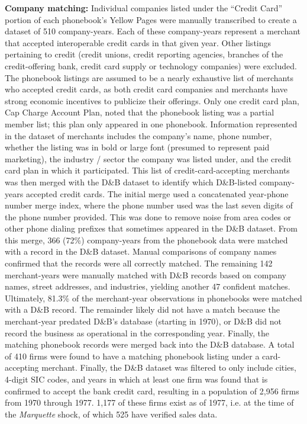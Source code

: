 \documentclass[12pt,english]{article}
\begin{document}
\textbf{Company matching:}
Individual companies listed under the ``Credit Card'' portion of each phonebook's Yellow Pages were manually transcribed to create a dataset of 510 company-years. Each of these company-years represent a merchant that accepted interoperable credit cards in that given year. Other listings pertaining to credit (credit unions, credit reporting agencies, branches of the credit-offering bank, credit card supply or technology companies) were excluded. The phonebook listings are assumed to be a nearly exhaustive list of merchants who accepted credit cards, as both credit card companies and merchants have strong economic incentives to publicize their offerings. Only one credit card plan, Cap Charge Account Plan, noted that the phonebook listing was a partial member list; this plan only appeared in one phonebook. Information represented in the dataset of merchants includes the company's name, phone number, whether the listing was in bold or large font (presumed to represent paid marketing), the industry / sector the company was listed under, and the credit card plan in which it participated. 
This list of credit-card-accepting merchants was then merged with the D\&B dataset to identify which D\&B-listed company-years accepted credit cards. The initial merge used a concatenated year-phone number merge index, where the phone number used was the last seven digits of the phone number provided. This was done to remove noise from area codes or other phone dialing prefixes that sometimes appeared in the D\&B dataset. From this merge, 366 (72\%) company-years from the phonebook data were matched with a record in the D\&B dataset. Manual comparisons of company names confirmed that the records were all correctly matched. The remaining 142 merchant-years were manually matched with D\&B records based on company names, street addresses, and industries, yielding another 47 confident matches. Ultimately, 81.3\% of the merchant-year observations in phonebooks were matched with a D\&B record. The remainder likely did not have a match because the merchant-year predated D\&B's database (starting in 1970), or D\&B did not record the business as operational in the corresponding year. Finally, the matching phonebook records were merged back into the D\&B database. A total of 410 firms were found to have a matching phonebook listing under a card-accepting merchant. Finally, the D\&B dataset was filtered to only include cities, 4-digit SIC codes, and years in which at least one firm was found that is confirmed to accept the bank credit card, resulting in a population of 2,956 firms from 1970 through 1977. 1,177 of these firms exist as of 1977, i.e. at the time of the \emph{Marquette} shock, of which 525 have verified sales data. 
\end{document}
